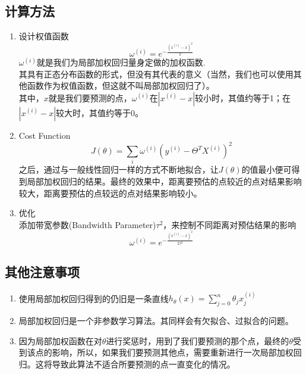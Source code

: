 \subsection{计算方法}
\begin{enumerate}
	\item 设计权值函数
	\begin{equation}
		\omega^{(i)} = e^{-\frac{(x^{(i)}-x)^2}{2}}
	\end{equation}
	$\omega^{(i)}$就是我们为局部加权回归量身定做的加权函数. \\
	其具有正态分布函数的形式，但没有其代表的意义（当然，我们也可以使用其他函数作为权值函数，但这就不叫局部加权回归了）。\\
	其中，$x$就是我们要预测的点，$\omega^{(i)}$在$|x^{(i)}-x|$较小时，其值约等于1；在$|x^{(i)}-x|$较大时，其值约等于0。\\
	\item Cost Function
	\begin{equation}
		J(\theta) = \sum_{i}\omega^{(i)}(y^{(i)} - \Theta^TX^{(i)})^2
	\end{equation}
	之后，通过与一般线性回归一样的方式不断地拟合，让$J(\theta)$的值最小便可得到局部加权回归的结果。最终的效果中，距离要预估的点较近的点对结果影响较大，距离要预估的点较远的点对结果影响较小。
	\item 优化 \\
	添加带宽参数(Bandwidth Parameter)$\tau^2$，来控制不同距离对预估结果的影响
	\begin{equation}
		\omega^{(i)} = e^{-\frac{(x^{(i)}-x)^2}{2\tau^2}}
	\end{equation}
	
\end{enumerate}

\subsection{其他注意事项}
\begin{enumerate}
	\item 使用局部加权回归得到的仍旧是一条直线$h_{\theta}(x)= \sum_{j=0}^n\theta_jx_j^{(i)}$
	\item 局部加权回归是一个非参数学习算法。其同样会有欠拟合、过拟合的问题。
	\item 因为局部加权函数在对$\theta$进行奖惩时，用到了我们要预测的那个点，最终的$\theta$受到该点的影响，所以，如果我们要预测其他点，需要重新进行一次局部加权回归。这将导致此算法不适合所要预测的点一直变化的情况。
\end{enumerate}







